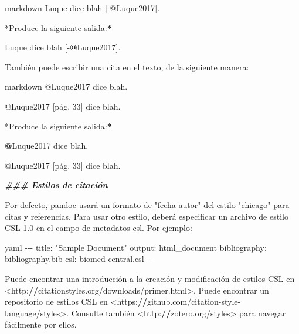 \documentclass[11pt,a4paper,oneside,]{article}
\newenvironment{Shaded}{\begin{snugshade}}{\end{snugshade}}
\newcommand{\AttributeTok}[1]{\textcolor[rgb]{0.77,0.63,0.00}{#1}}
\newcommand{\DecValTok}[1]{\textcolor[rgb]{0.00,0.00,0.81}{#1}}
\newcommand{\DocumentationTok}[1]{\textcolor[rgb]{0.56,0.35,0.01}{\textbf{\textit{#1}}}}
\newcommand{\ErrorTok}[1]{\textcolor[rgb]{0.64,0.00,0.00}{\textbf{#1}}}
\newcommand{\FloatTok}[1]{\textcolor[rgb]{0.00,0.00,0.81}{#1}}
\newcommand{\NormalTok}[1]{#1}
\newcommand{\SpecialCharTok}[1]{\textcolor[rgb]{0.00,0.00,0.00}{#1}}
\newcommand{\StringTok}[1]{\textcolor[rgb]{0.31,0.60,0.02}{#1}}
\numberwithin{dummy}{section}
\theoremstyle{ocrenumbox}
\theoremstyle{blacknumex}
\theoremstyle{blacknumbox}
\theoremstyle{ocrenum}
\theoremstyle{ocrenum}
\begin{document}
\begin{Shaded}
\begin{Highlighting}[numbers=left,,firstnumber=1101,]
\StringTok{\textasciigrave{}\textasciigrave{}\textasciigrave{}}\AttributeTok{markdown}
\AttributeTok{Luque dice blah [{-}@Luque2017].}
\StringTok{\textasciigrave{}\textasciigrave{}\textasciigrave{}}

\SpecialCharTok{*}\NormalTok{Produce la siguiente salida}\SpecialCharTok{:}\ErrorTok{*}

\NormalTok{Luque dice blah [}\SpecialCharTok{{-}}\ErrorTok{@}\NormalTok{Luque2017].}

\NormalTok{También puede escribir una cita en el texto, de la siguiente manera}\SpecialCharTok{:}

\StringTok{\textasciigrave{}\textasciigrave{}\textasciigrave{}}\AttributeTok{markdown}
\AttributeTok{@Luque2017 dice blah.}

\AttributeTok{@Luque2017 [pág. 33] dice blah.}
\StringTok{\textasciigrave{}\textasciigrave{}\textasciigrave{}}

\SpecialCharTok{*}\NormalTok{Produce la siguiente salida}\SpecialCharTok{:}\ErrorTok{*}

\ErrorTok{@}\NormalTok{Luque2017 dice blah.}

\SpecialCharTok{@}\NormalTok{Luque2017 [pág. }\DecValTok{33}\NormalTok{] dice blah.}


\DocumentationTok{\#\#\# Estilos de citación}

\NormalTok{Por defecto, pandoc usará un formato de }\StringTok{"fecha{-}autor"}\NormalTok{ del estilo }\StringTok{"chicago"}\NormalTok{ para citas y referencias. Para usar otro estilo, deberá especificar un archivo de estilo CSL }\FloatTok{1.0}\NormalTok{ en el campo de metadatos csl. Por ejemplo}\SpecialCharTok{:}

\StringTok{\textasciigrave{}\textasciigrave{}\textasciigrave{}}\AttributeTok{yaml}
\AttributeTok{{-}{-}{-}}
\AttributeTok{title: "Sample Document"}
\AttributeTok{output: html\_document}
\AttributeTok{bibliography: bibliography.bib}
\AttributeTok{csl: biomed{-}central.csl}
\AttributeTok{{-}{-}{-}}
\StringTok{\textasciigrave{}\textasciigrave{}\textasciigrave{}}

\NormalTok{Puede encontrar una introducción a la creación y modificación de estilos CSL en }\SpecialCharTok{\textless{}}\NormalTok{http}\SpecialCharTok{:}\ErrorTok{//}\NormalTok{citationstyles.org}\SpecialCharTok{/}\NormalTok{downloads}\SpecialCharTok{/}\NormalTok{primer.html}\SpecialCharTok{\textgreater{}}\NormalTok{. Puede encontrar un repositorio de estilos CSL en }\SpecialCharTok{\textless{}}\NormalTok{https}\SpecialCharTok{:}\ErrorTok{//}\NormalTok{github.com}\SpecialCharTok{/}\NormalTok{citation}\SpecialCharTok{{-}}\NormalTok{style}\SpecialCharTok{{-}}\NormalTok{language}\SpecialCharTok{/}\NormalTok{styles}\SpecialCharTok{\textgreater{}}\NormalTok{. Consulte también }\SpecialCharTok{\textless{}}\NormalTok{http}\SpecialCharTok{:}\ErrorTok{//}\NormalTok{zotero.org}\SpecialCharTok{/}\NormalTok{styles}\SpecialCharTok{\textgreater{}}\NormalTok{ para navegar fácilmente por ellos.}



\end{Highlighting}
\end{Shaded}
\end{document}
